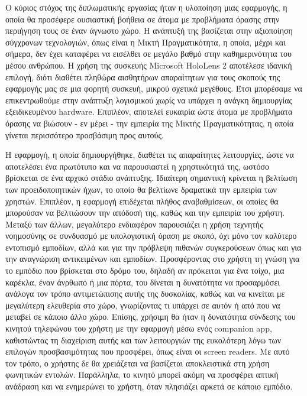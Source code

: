 Ο κύριος στόχος της διπλωματικής εργασίας ήταν η υλοποίηση μιας εφαρμογής, η οποία θα προσέφερε ουσιαστική βοήθεια σε άτομα με προβλήματα όρασης στην περιήγηση τους σε έναν άγνωστο χώρο. Η ανάπτυξή της βασίζεται στην αξιοποίηση σύγχρονων τεχνολογιών, όπως είναι η Μικτή Πραγματικότητα, η οποία, μέχρι και σήμερα, δεν έχει καταφέρει να εισέλθει σε μεγάλο βαθμό στην καθημερινότητα του μέσου ανθρώπου. Η χρήση της συσκευής Microsoft HoloLens 2 αποτέλεσε ιδανική επιλογή, διότι διαθέτει πληθώρα αισθητήρων απαραίτητων για τους σκοπούς της εφαρμογής μας σε μια φορητή συσκευή, μικρού σχετικά μεγέθους. Έτσι μπορέσαμε να επικεντρωθούμε στην ανάπτυξη λογισμικού χωρίς να υπάρχει η ανάγκη δημιουργίας εξειδικευμένου hardware. Επιπλέον, αποτελεί ευκαιρία ώστε άτομα με προβλήματα όρασης να βιώσουν - εν μέρει - την εμπειρία της Μικτής Πραγματικότητας, η οποία γίνεται περισσότερο προσβάσιμη προς αυτούς. %

Η εφαρμογή, η οποία δημιουργήθηκε, διαθέτει τις απαραίτητες λειτουργίες, ώστε να αποτελέσει ένα πρωτότυπο και να παρουσιαστεί η χρηστικότητά της, ωστόσο βρίσκεται σε ένα αρχικό στάδιο ανάπτυξης. Ιδιαίτερη σημαντική κρίνεται η βελτίωση των προειδοποιητικών ήχων, το οποίο θα βελτίωνε δραματικά την εμπειρία των χρηστών. Επιπλέον, η εφαρμογή επιδέχεται πλήθος αναβαθμίσεων, οι οποίες θα μπορούσαν να βελτιώσουν την απόδοσή της, καθώς και την εμπειρία του χρήστη. Μεταξύ των άλλων, μεγαλύτερο ενδιαφέρον παρουσιάζει η χρήση τεχνητής νοημοσύνης σε συνδυασμό με υπολογιστική όραση με σκοπό, όχι μόνο τον καλύτερο εντοπισμό εμποδίων, αλλά και για την πρόβλεψη πιθανών συγκερούσεων όπως και για την αναγνώριση αντικειμένων και εμποδίων. Προσφέροντας στο χρήστη τη γνώση για το εμπόδιο που βρίσκεται στο δρόμο του, δηλαδή αν πρόκειται για ένα τοίχο, μια καρέκλα, έναν άνρθωπο ή μια πόρτα, του δίνεται η δυνατότητα να προσαρμόσει ανάλογα τον τρόπο αντιμετώπισης αυτής της δυσκολίας, καθώς και να κινείται με μεγαλύτερη ελευθερία στο χώρο, γνωρίζοντας τι υπάρχει σε αυτόν ή από που να μεταβεί σε κάποιο άλλο χώρο. Επίσης, χρήσιμη θα ήταν η δυνατότητα σύνδεσης του κινητού τηλεφώνου του χρήστη με την εφαρμογή μέσω ενός companion app, καθιστώντας τη διαχείριση αυτής και των λειτουργιών της ευκολότερη λόγω των επιλογών προσβασιμότητας που προσφέρει, όπως είναι οι screen readers. Με αυτό τον τρόπο, ο χρήστης δε θα χρειάζεται να βασίζεται αποκλειστικά στη χρήση φωνητικών εντολών. Παράλληλα, το κινητό μπορεί ακόμη να προσφέρει απτική ανάδραση και να ενημερώνει το χρήστη, όταν πλησιάζει αρκετά σε κάποιο εμπόδιο.